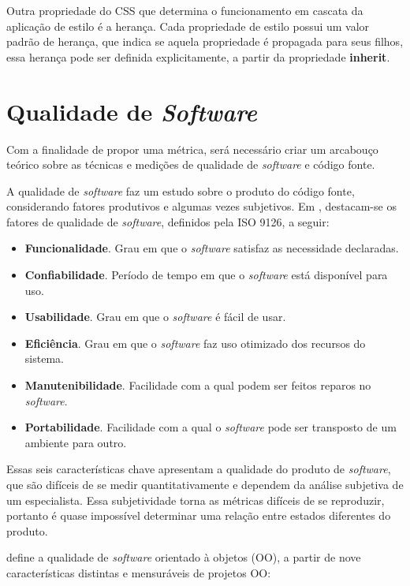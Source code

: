 Outra propriedade do CSS que determina o funcionamento em cascata da aplicação de estilo é a herança. Cada propriedade de estilo possui um valor padrão de herança, que indica se aquela propriedade é propagada para seus filhos, essa herança pode ser definida explicitamente, a partir da propriedade \textbf{inherit}. 

\section{Qualidade de \textit{Software}}

Com a finalidade de propor uma métrica, será necessário criar um arcabouço teórico sobre as técnicas e medições de qualidade de \textit{software} e código fonte.

A qualidade de \textit{software} faz um estudo sobre o produto do código fonte, considerando fatores produtivos e algumas vezes subjetivos. Em , destacam-se os fatores de qualidade de \textit{software}, definidos pela ISO 9126, a seguir:

\begin{itemize}
	\item \textbf{Funcionalidade}. Grau em que o \textit{software} satisfaz as necessidade declaradas.
	\item \textbf{Confiabilidade}. Período de tempo em que o \textit{software} está disponível para uso.
	\item \textbf{Usabilidade}. Grau em que o \textit{software} é fácil de usar.
	\item \textbf{Eficiência}. Grau em que o \textit{software} faz uso otimizado dos recursos do sistema.
	\item \textbf{Manutenibilidade}. Facilidade com a qual podem ser feitos reparos no \textit{software}.
	\item \textbf{Portabilidade}. Facilidade com a qual o \textit{software} pode ser transposto de um ambiente para outro.
\end{itemize}

Essas seis características chave apresentam a qualidade do produto de \textit{software}, que são difíceis de se medir quantitativamente e dependem da análise subjetiva de um especialista. Essa subjetividade torna as métricas difíceis de se reproduzir, portanto é quase impossível determinar uma relação entre estados diferentes do produto.

 define a qualidade de \textit{software} orientado à objetos (OO), a partir de nove características distintas e mensuráveis de projetos OO:


